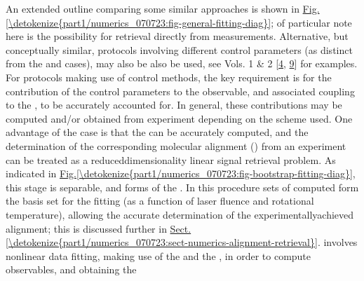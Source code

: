 \documentclass[letterpaper,table,10pt,english]{jupyterBook}
\begin{document}
\sphinxAtStartPar
An extended outline comparing some similar approaches is shown in \hyperref[\detokenize{part1/numerics_070723:fig-general-fitting-diag}]{Fig.\@ \ref{\detokenize{part1/numerics_070723:fig-general-fitting-diag}}}; of particular note here is the possibility for retrieval directly from {\hyperref[\detokenize{backmatter/glossary:term-MF}]{}} measurements. Alternative, but conceptually similar, protocols involving different control parameters (as distinct from the {\hyperref[\detokenize{backmatter/glossary:term-RWP}]{}} and {\hyperref[\detokenize{backmatter/glossary:term-MF}]{}} cases), may also be also be used, see  Vols. 1 \& 2 {[}\hyperlink{cite.backmatter/bibliography:id677}{4}, \hyperlink{cite.backmatter/bibliography:id678}{9}{]} for examples. For protocols making use of control methods, the key requirement is for the contribution of the control parameters to the observable, and associated coupling to the {\hyperref[\detokenize{backmatter/glossary:term-channel-functions}]{}}, to be accurately accounted for. In general, these contributions may be computed and/or obtained from experiment depending on the scheme used. One advantage of the {\hyperref[\detokenize{backmatter/glossary:term-RWP}]{}} case is that the {\hyperref[\detokenize{backmatter/glossary:term-RWP}]{}} can be accurately computed, and the determination of the corresponding molecular alignment ({\hyperref[\detokenize{backmatter/glossary:term-ADMs}]{}}) from an experiment can be treated as a reduced\sphinxhyphen{}dimensionality linear signal retrieval problem. As indicated in \hyperref[\detokenize{part1/numerics_070723:fig-bootstrap-fitting-diag}]{Fig.\@ \ref{\detokenize{part1/numerics_070723:fig-bootstrap-fitting-diag}}}, this stage is separable, and forms  of the {\hyperref[\detokenize{backmatter/glossary:term-bootstrap-retrieval-protocol}]{}}. In this procedure sets of computed {\hyperref[\detokenize{backmatter/glossary:term-ADMs}]{}} form the basis set for the fitting (as a function of laser fluence and rotational temperature), allowing the accurate determination of the experimentally\sphinxhyphen{}achieved alignment; this is discussed further in \hyperref[\detokenize{part1/numerics_070723:sect-numerics-alignment-retrieval}]{Sect.\@ \ref{\detokenize{part1/numerics_070723:sect-numerics-alignment-retrieval}}}.  involves non\sphinxhyphen{}linear data fitting, making use of the {\hyperref[\detokenize{backmatter/glossary:term-ADMs}]{}} and the {\hyperref[\detokenize{backmatter/glossary:term-channel-functions}]{}}, in order to compute observables, and obtaining the 
\end{document}
